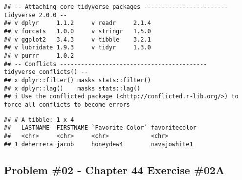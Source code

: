 \documentclass[
]{article}
\newenvironment{Shaded}{\begin{snugshade}}{\end{snugshade}}
\newcommand{\AttributeTok}[1]{\textcolor[rgb]{0.13,0.29,0.53}{#1}}
\newcommand{\FunctionTok}[1]{\textcolor[rgb]{0.13,0.29,0.53}{\textbf{#1}}}
\newcommand{\NormalTok}[1]{#1}
\newcommand{\OtherTok}[1]{\textcolor[rgb]{0.56,0.35,0.01}{#1}}
\newcommand{\SpecialCharTok}[1]{\textcolor[rgb]{0.81,0.36,0.00}{\textbf{#1}}}
\newcommand{\StringTok}[1]{\textcolor[rgb]{0.31,0.60,0.02}{#1}}
\begin{document}
\begin{verbatim}
## -- Attaching core tidyverse packages ------------------------ tidyverse 2.0.0 --
## v dplyr     1.1.2     v readr     2.1.4
## v forcats   1.0.0     v stringr   1.5.0
## v ggplot2   3.4.3     v tibble    3.2.1
## v lubridate 1.9.3     v tidyr     1.3.0
## v purrr     1.0.2     
## -- Conflicts ------------------------------------------ tidyverse_conflicts() --
## x dplyr::filter() masks stats::filter()
## x dplyr::lag()    masks stats::lag()
## i Use the conflicted package (<http://conflicted.r-lib.org/>) to force all conflicts to become errors
\end{verbatim}

\begin{Shaded}
\end{Shaded}

\begin{verbatim}
## # A tibble: 1 x 4
##   LASTNAME  FIRSTNAME `Favorite Color` favoritecolor
##   <chr>     <chr>     <chr>            <chr>        
## 1 deherrera jacob     honeydew4        navajowhite1
\end{verbatim}

\newpage

\hypertarget{problem-02---chapter-44-exercise-02a}{%
\subsection{Problem \#02 - Chapter 44 Exercise
\#02A}\label{problem-02---chapter-44-exercise-02a}}
\end{document}
